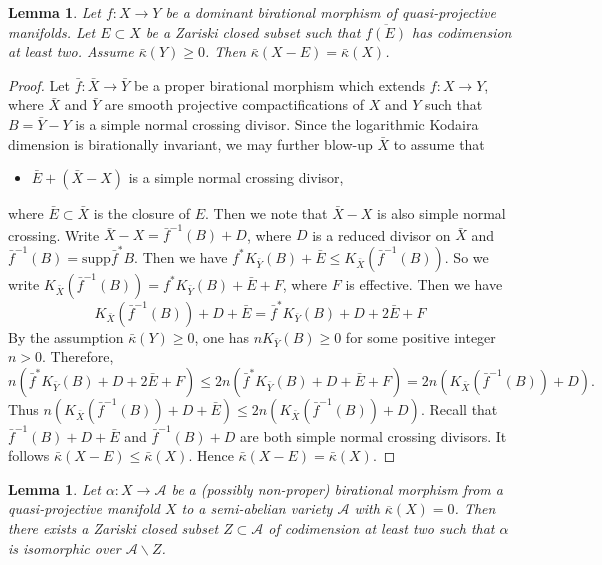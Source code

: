 \documentclass[11pt,english]{smfart}
\theoremstyle{plain}
\newtheorem{lem}[thm]{Lemma}
\theoremstyle{definition}
\theoremstyle{remark}
\numberwithin{equation}{section}
\theoremstyle{plain}
\newcommand{\cA}{\mathcal A}
\begin{document}
\begin{lem}  \label{lem:same Kd}
	Let $f:X\to Y$ be a dominant birational morphism of  quasi-projective manifolds. 
	Let $E\subset X$ be a Zariski closed subset such that $\overline{f(E)}$ has codimension at least two.  
	Assume $\bar{\kappa}(Y)\geq 0$.
	Then $\bar{\kappa}(X-E)=\bar{\kappa}(X)$. 
\end{lem}
\begin{proof}   
	Let $\bar{f}:\bar{X}\to \bar{Y}$ be a proper birational morphism which extends $f:X\to Y$, where $\bar{X}$ and $\bar{Y}$ are smooth projective compactifications of $X$ and $Y$ such that   $B=\bar{Y}-Y$ is a simple normal crossing divisor. Since the logarithmic Kodaira dimension is  birationally invariant, we may further blow-up  \(\bar{X}\) to assume that 
	\begin{itemize}
		\item $\bar{E}+(\bar{X}-X)$ is a simple normal crossing  divisor,
	\end{itemize} 
	where $\bar{E}\subset \bar{X}$ is the closure of $E$.
	Then we note that $\bar{X}-X$ is also simple normal crossing.
	Write $\bar{X}-X=\bar{f}^{-1}(B)+D$, where $D$ is a reduced divisor on $\bar{X}$ and $\bar{f}^{-1}(B)=\mathrm{supp}\bar{f}^*B$.
	Then we have $f^*K_{\bar{Y}}(B)+\bar{E}\leq K_{\bar{X}}(\bar{f}^{-1}(B))$.
	So we write $K_{\bar{X}}(\bar{f}^{-1}(B))=f^*K_{\bar{Y}}(B)+\bar{E}+F$, where $F$ is effective.
	Then we have
	$$
	K_{\bar{X}}(\bar{f}^{-1}(B))+D+\bar{E}=\bar{f}^*K_{\bar{Y}}(B)+D+2\bar{E}+F
	$$
	By the assumption $\bar{\kappa}(Y)\geq 0$, one has $nK_{\bar{Y}}(B)\geq 0$ for some positive integer $n>0$.
	Therefore,
	$$
	n(\bar{f}^*K_{\bar{Y}}(B)+D+2\bar{E}+F)\leq 2n(\bar{f}^*K_{\bar{Y}}(B)+D+\bar{E}+F)=2n(K_{\bar{X}}(\bar{f}^{-1}(B))+D).
	$$
	Thus 
	$n(K_{\bar{X}}(\bar{f}^{-1}(B))+D+\bar{E})\leq 2n(K_{\bar{X}}(\bar{f}^{-1}(B))+D) $. 
	Recall that $\bar{f}^{-1}(B)+D+\bar{E}$ and $\bar{f}^{-1}(B)+D$ are both simple normal crossing divisors.  	It follows 
	$\bar{\kappa}(X-E)\leq \bar{\kappa}(X)$. 
	Hence $\bar{\kappa}(X-E)=\bar{\kappa}(X)$.  
\end{proof} 





\begin{lem}\label{lem:abelian pi0}
	Let $\alpha:X\to \cA$ be  a  (possibly non-proper)  birational morphism  from a quasi-projective manifold $X$ to a semi-abelian variety $\cA$ with   $\overline{\kappa}(X)=0$.  Then  there exists a Zariski closed subset $Z\subset \cA$ of codimension at least two such  that $\alpha$ is   isomorphic
	over $\cA\backslash Z$.   
\end{lem}
\end{document}
